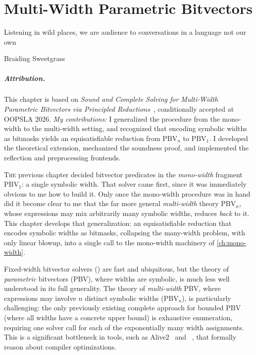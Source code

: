 \chapter{Multi-Width Parametric Bitvectors}
\label{ch:multi-width}
\epigraph{Listening in wild places, we are audience to conversations in a language not our own}{Braiding Sweetgrass}

\paragraph*{Attribution.} This chapter is based on \emph{Sound and Complete
Solving for Multi-Width Parametric Bitvectors via Principled
Reductions}~\citep{bhat2026multiwidth}, conditionally accepted at OOPSLA 2026.
\emph{My contributions:} I generalized the procedure from the mono-width to the
multi-width setting, and recognized that encoding symbolic widths as bitmasks yields an
equisatisfiable reduction from $\text{PBV}_n$ to $\text{PBV}_1$. I developed the
theoretical extension, mechanized the soundness proof, and implemented the
reflection and preprocessing frontends.

\lettrine{T}{he} previous chapter decided bitvector predicates in the
\emph{mono-width} fragment $\text{PBV}_1$: a single symbolic width. That solver
came first, since it was immediately obvious to me how to build it.
Only once the mono-width procedure was in hand did it become clear to me that the far more general
\emph{multi-width} theory $\text{PBV}_n$, whose expressions may mix arbitrarily
many symbolic widths, reduces \emph{back} to it. This chapter develops that
generalization: an equisatisfiable reduction that encodes symbolic widths as
bitmasks, collapsing the many-width problem, with only linear blowup, into a
single call to the mono-width machinery of \cref{ch:mono-width}.

Fixed-width bitvector solvers (\qfbv{}) are fast and ubiquitous, but the theory
of \emph{parametric} bitvectors
(PBV), where widths are symbolic, is much less well understood in its full
generality. The theory of \emph{multi-width} PBV, where expressions may
involve $n$ distinct symbolic widths ($\text{PBV}_n$), is particularly
challenging: the only previously existing complete approach for bounded PBV
(where all widths have a concrete upper bound) is exhaustive enumeration,
requiring one \qfbv{} solver call for each of the exponentially many width
assignments. This is a significant bottleneck in tools, such as
Alive2~\citep{lopes2021alive2} and \hydra{}~\citep{hydra}, that
formally reason about compiler optimizations.


